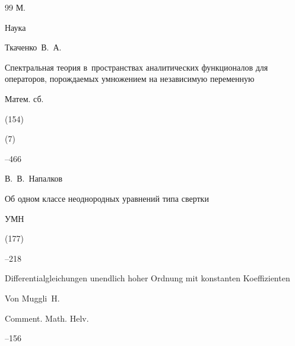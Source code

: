 \begin{thebibliography}{99}
\publaddr М.

\publ Наука






\by Ткаченко~В.~А.

\paper Спектральная теория в~пространствах аналитических функционалов для операторов, порождаемых умножением на независимую переменную

\jour Матем. сб.


(154)

(7)

--466







\by В.~В.~Напалков

\paper Об одном классе неоднородных уравнений типа свертки

\jour УМН



(177)

--218










\paper Differentialgleichungen unendlich hoher Ordnung mit konstanten Koeffizienten

\by    Von Muggli~H.

\jour  Comment. Math. Helv.




--156








\end{thebibliography}
